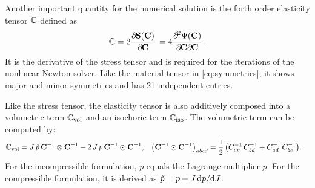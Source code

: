 Another important quantity for the numerical solution is the forth order elasticity tensor $\mathbb{C}$ defined as
\begin{align*}
  \C = 2\p{\bfS(\bfC)}{\bfC} = 4\dfrac{\partial^2 \Psi(\bfC)}{\partial\bfC\partial\bfC}.
\end{align*}
It is the derivative of the stress tensor and is required for the iterations of the nonlinear Newton solver. Like the material tensor in \cref{eq:symmetries}, it shows major and minor symmetries and has 21 independent entries.

Like the stress tensor, the elasticity tensor is also additively composed into a volumetric term $\mathbb{C}_\text{vol}$ and an isochoric term $\mathbb{C}_\text{iso}$. The volumetric term can be computed by:%
\begin{align*}
  \mathbb{C}_\text{vol} &= J\,\tilde{p}\,\textbf{C}^{-1} \otimes \textbf{C}^{-1} - 2\,J\,p\,\textbf{C}^{-1} \odot \textbf{C}^{-1}, &
  \big(\textbf{C}^{-1} \odot \textbf{C}^{-1}\big)_{abcd} &= \displaystyle\frac{\displaystyle{1}}{\displaystyle{2}}\,\big(C^{-1}_{ac}\,C^{-1}_{bd} + C^{-1}_{ad}\,C^{-1}_{bc}\big).
\end{align*}
For the incompressible formulation, $\tilde{p}$ equals the Lagrange multiplier $p$. For the compressible formulation, it is derived as $\tilde{p} = p + J\,\d p/\d J$.


